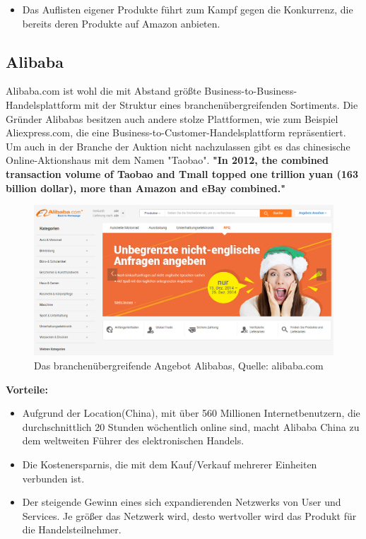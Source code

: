 \documentclass[11pt,a4paper]{article}
\begin{document}
\begin{itemize}
	\item Das Auflisten eigener Produkte führt zum Kampf gegen die Konkurrenz, die bereits deren Produkte auf Amazon anbieten. 
\end{itemize}
\newpage
\subsection{Alibaba}
Alibaba.com ist wohl die mit Abstand größte Business-to-Business-Handelsplattform mit der Struktur eines branchenübergreifenden Sortiments. Die Gründer Alibabas besitzen auch andere stolze Plattformen, wie zum Beispiel Aliexpress.com, die eine Business-to-Customer-Handelsplattform repräsentiert. Um auch in der Branche der Auktion nicht nachzulassen gibt es das chinesische Online-Aktionshaus mit dem Namen "Taobao". \textbf{"In 2012, the combined transaction volume of Taobao and Tmall topped one trillion yuan (163 billion dollar), more than Amazon and eBay combined."}

\begin{figure}[ht!]
	\centering
	\includegraphics[width=180mm]{alibaba}
	\caption{Das branchenübergreifende Angebot Alibabas, Quelle: alibaba.com \label{alibaba}}
\end{figure}

\noindent \textbf{Vorteile:}

\begin{itemize}
	\item Aufgrund der Location(China), mit über 560 Millionen Internetbenutzern, die durchschnittlich 20 Stunden wöchentlich online sind, macht Alibaba China zu dem weltweiten Führer des elektronischen Handels.
	\item Die Kostenersparnis, die mit dem Kauf/Verkauf mehrerer Einheiten verbunden ist.
	\item Der steigende Gewinn eines sich expandierenden Netzwerks von User und Services. Je größer das Netzwerk wird, desto wertvoller wird das Produkt für die Handelsteilnehmer.
\end{itemize}
 
\end{document}
